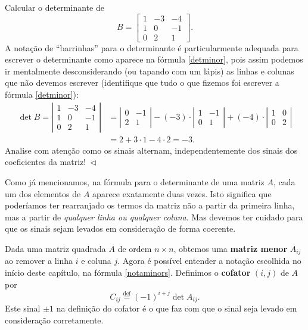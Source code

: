 \begin{ex}
	Calcular o determinante de
	\begin{equation}
	B = \begin{bmatrix}
	1 & -3 & -4  \\
	1 & 0 & -1 \\
	0 & 2 & 1
	\end{bmatrix}.
	\end{equation} A notação de ``barrinhas'' para o determinante é particularmente adequada para escrever o determinante como aparece na fórmula \eqref{detminor}, pois assim podemos ir mentalmente desconsiderando (ou tapando com um lápis) as linhas e colunas que não devemos escrever (identifique que tudo o que fizemos foi escrever a fórmula \eqref{detminor}):
        \begin{equation}
	\begin{split}
	\det B = \left| \begin{matrix}
	1 & -3 & -4  \\
    1 & 0  & -1  \\
    0 & 2  & 1
	\end{matrix} \right| & = \left| \begin{matrix}
	0 & -1 \\
	2 & 1
	\end{matrix} \right| - (-3) \cdot \left| \begin{matrix}
	1 &  -1 \\
	0 &  1
	\end{matrix} \right| + (-4) \cdot \left| \begin{matrix}
	1 & 0  \\
	0 & 2
	\end{matrix} \right| \\ & = 2 + 3 \cdot 1  -4 \cdot 2 = -3.
	\end{split}
      \end{equation}
 Analise com atenção como os sinais alternam, independentemente dos sinais dos coeficientes da matriz!$ \ \lhd$
\end{ex}


Como já mencionamos, na fórmula para o determinante de uma matriz $A$, cada um dos elementos de $A$ aparece exatamente duas vezes. Isto significa que poderíamos ter rearranjado os termos da matriz não a partir da primeira linha, mas a partir de \textit{qualquer linha ou qualquer coluna}. Mas devemos ter cuidado para que os sinais sejam levados em consideração de forma coerente.

Dada uma matriz quadrada $A$ de ordem $n \times n$, obtemos uma \textbf{matriz menor} $A_{ij}$ ao remover a linha $i$ e coluna $j$. Agora é possível entender a notação escolhida no início deste capítulo, na fórmula \eqref{notaminors}. Definimos o \textbf{cofator} $(i,j)$ de $A$ por
\begin{equation}
C_{ij} \stackrel{\text{def}}{=} (-1)^{i + j} \det A_{ij}.
\end{equation} Este sinal $\pm 1$ na definição do cofator é o que faz com que o sinal seja levado em consideração corretamente.

